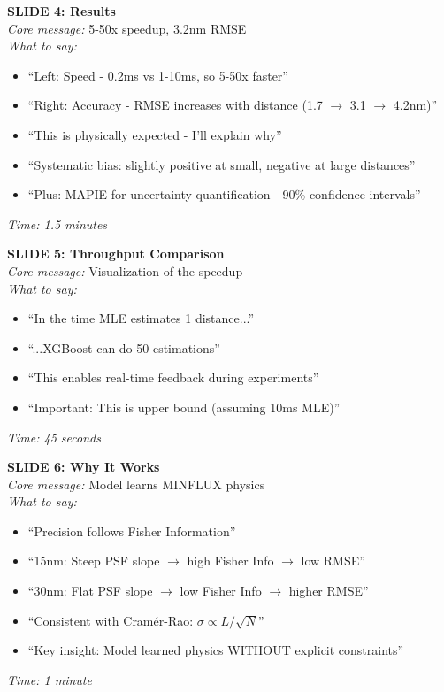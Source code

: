 \documentclass[a4paper,10pt]{article}
\begin{document}
\begin{mdframed}[style=karte]
\textbf{SLIDE 4: Results}\\[5pt]
\textit{Core message:} 5-50x speedup, 3.2nm RMSE\\[5pt]
\textit{What to say:}
\begin{itemize}[leftmargin=*, nosep]
    \item ``Left: Speed - 0.2ms vs 1-10ms, so 5-50x faster''
    \item ``Right: Accuracy - RMSE increases with distance (1.7 $\rightarrow$ 3.1 $\rightarrow$ 4.2nm)''
    \item ``This is physically expected - I'll explain why''
    \item ``Systematic bias: slightly positive at small, negative at large distances''
    \item ``Plus: MAPIE for uncertainty quantification - 90\% confidence intervals''
\end{itemize}
\textit{Time: 1.5 minutes}
\end{mdframed}

\begin{mdframed}[style=karte]
\textbf{SLIDE 5: Throughput Comparison}\\[5pt]
\textit{Core message:} Visualization of the speedup\\[5pt]
\textit{What to say:}
\begin{itemize}[leftmargin=*, nosep]
    \item ``In the time MLE estimates 1 distance...''
    \item ``...XGBoost can do 50 estimations''
    \item ``This enables real-time feedback during experiments''
    \item ``Important: This is upper bound (assuming 10ms MLE)''
\end{itemize}
\textit{Time: 45 seconds}
\end{mdframed}

\begin{mdframed}[style=karte]
\textbf{SLIDE 6: Why It Works}\\[5pt]
\textit{Core message:} Model learns MINFLUX physics\\[5pt]
\textit{What to say:}
\begin{itemize}[leftmargin=*, nosep]
    \item ``Precision follows Fisher Information''
    \item ``15nm: Steep PSF slope $\rightarrow$ high Fisher Info $\rightarrow$ low RMSE''
    \item ``30nm: Flat PSF slope $\rightarrow$ low Fisher Info $\rightarrow$ higher RMSE''
    \item ``Consistent with Cram\'er-Rao: $\sigma \propto L/\sqrt{N}$''
    \item ``Key insight: Model learned physics WITHOUT explicit constraints''
\end{itemize}
\textit{Time: 1 minute}
\end{mdframed}
\end{document}
